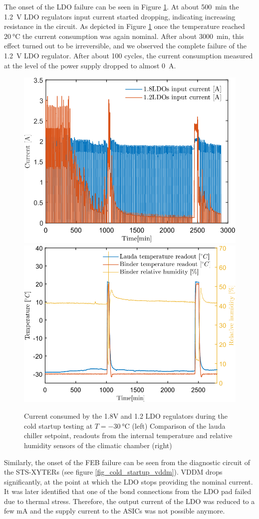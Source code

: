 The onset of the \gls{LDO} failure can be seen in Figure \ref{fig_cold_startup}. At about 500~min the 1.2~V LDO regulators input current started dropping, indicating increasing resistance in the circuit. As depicted in Figure \ref{fig_cold_startup} once the temperature reached $\SI{20}{\celsius}$ the current consumption was again nominal. After about  3000~min, this effect turned out to be irreversible, and we observed the complete failure of the 1.2~V \gls{LDO} regulator. After about 100 cycles, the current consumption measured at the level of the power supply dropped to almost 0~A. 
\begin{figure}[!h]
\centering
\includegraphics[width=0.46\columnwidth]{Chapter4/images/currents_long.png}
\includegraphics[width=0.48\columnwidth]{Chapter4/images/cycling.png}
\caption{Current consumed by the 1.8V and 1.2 \gls{LDO} regulators during the cold startup testing at $T = \SI{-30}{\celsius}$ (left)
Comparison of the lauda chiller setpoint, readouts from the internal temperature and relative humidity sensors of the climatic chamber (right)}
\label{fig_cold_startup}
\end{figure}

Similarly, the onset of the \gls{FEB} failure can be seen from the diagnostic circuit of the STS-XYTERs (see figure \ref{fig_cold_startup_vddm}). VDDM drops significantly, at the point at which the \gls{LDO} stops providing the nominal current. It was later identified that one of the bond connections from the \gls{LDO} pad failed due to thermal stress. Therefore, the output current of the \gls{LDO} was reduced to a few mA and the supply current to the \glspl{ASIC} was not possible anymore.

